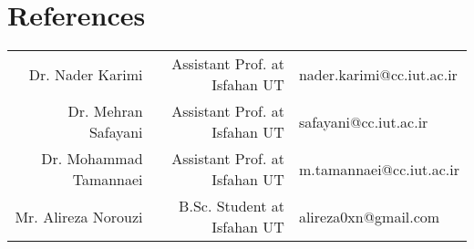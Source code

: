 \documentclass[a4paper,10pt]{article}
\begin{document}
	\section{References}
		\begin{tabular}{rrl}
			Dr. Nader Karimi \href{https://scholar.google.com/citations?user=mZGNr2QAAAAJ&hl=en}{\footnotesize \faExternalLink} & Assistant Prof. at Isfahan UT 
			& nader.karimi@cc.iut.ac.ir \href{mailto:nader.karimi@cc.iut.ac.ir}{\footnotesize \faExternalLink}\\
			
			Dr. Mehran Safayani \href{http://safayani.iut.ac.ir/}{\footnotesize \faExternalLink}& Assistant Prof. at Isfahan UT 
			& safayani@cc.iut.ac.ir \href{mailto:safayani@cc.iut.ac.ir}{\footnotesize \faExternalLink}\\
			
			Dr. Mohammad Tamannaei \href{http://tamannaei.iut.ac.ir/}{\footnotesize \faExternalLink}& Assistant Prof. at Isfahan UT 
			& m.tamannaei@cc.iut.ac.ir \href{mailto:m.tamannaei@cc.iut.ac.ir}{\footnotesize \faExternalLink}\\
			
			Mr. Alireza Norouzi \href{https://www.linkedin.com/in/alireza-norouzi-8ab293aa}{\footnotesize \faExternalLink} & B.Sc. Student at Isfahan UT 
			& alireza0xn@gmail.com \href{mailto:alireza0xn@gmail.com}{\footnotesize \faExternalLink}\\
		\end{tabular}
			
	
	
\end{document}
